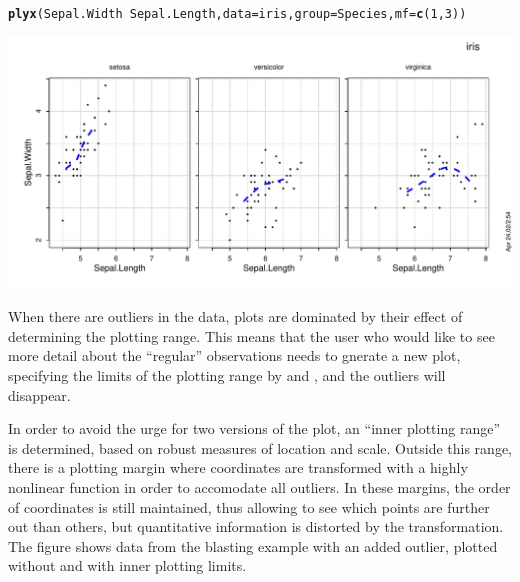 \documentclass[11pt]{article}\usepackage[]{graphicx}\usepackage[]{color}
\makeatletter
\def\maxwidth{ %
  \ifdim\Gin@nat@width>\linewidth
    \linewidth
  \else
    \Gin@nat@width
  \fi
}
\newcommand{\hlnum}[1]{\textcolor[rgb]{0.686,0.059,0.569}{#1}}%
\newcommand{\hlopt}[1]{\textcolor[rgb]{0,0,0}{#1}}%
\newcommand{\hlstd}[1]{\textcolor[rgb]{0.345,0.345,0.345}{#1}}%
\newcommand{\hlkwc}[1]{\textcolor[rgb]{0.333,0.667,0.333}{#1}}%
\newcommand{\hlkwd}[1]{\textcolor[rgb]{0.737,0.353,0.396}{\textbf{#1}}}%
\newenvironment{kframe}{%
 \def\at@end@of@kframe{}%
 \ifinner\ifhmode%
  \def\at@end@of@kframe{\end{minipage}}%
  \begin{minipage}{\columnwidth}%
 \fi\fi%
 \def\FrameCommand##1{\hskip\@totalleftmargin \hskip-\fboxsep
 \colorbox{shadecolor}{##1}\hskip-\fboxsep
     \hskip-\linewidth \hskip-\@totalleftmargin \hskip\columnwidth}%
 \MakeFramed {\advance\hsize-\width
   \@totalleftmargin\z@ \linewidth\hsize
   \@setminipage}}%
 {\par\unskip\endMakeFramed%
 \at@end@of@kframe}
\newenvironment{knitrout}{}{} %
\makeatother
\begin{document}
\begin{knitrout}
\color{fgcolor}\begin{kframe}
\begin{alltt}
\hlkwd{plyx}\hlstd{(Sepal.Width}\hlopt{~}\hlstd{Sepal.Length,} \hlkwc{data}\hlstd{=iris,} \hlkwc{group}\hlstd{=Species,} \hlkwc{mf}\hlstd{=}\hlkwd{c}\hlstd{(}\hlnum{1}\hlstd{,}\hlnum{3}\hlstd{))}
\end{alltt}
\end{kframe}
\includegraphics[width=\maxwidth]{figure/plyx_group-1} 

\end{knitrout}

When there are outliers in the data, plots are dominated by their effect of
determining the plotting range. This means that the user who would like to
see more detail about the ``regular'' observations needs to gnerate a new
plot, specifying the limits of the plotting range by  and ,
and the outliers will disappear.

In order to avoid the urge for two versions of the plot, an ``inner
plotting range'' is determined, based on robust measures of 
location and scale. Outside this range, there is a plotting margin where
coordinates are transformed with a highly nonlinear function in order to
accomodate all outliers. 
In these margins, the order of coordinates is still maintained, thus
allowing to see which points are further out than others, but quantitative
information is distorted by the transformation.
The figure shows data from the blasting example with an added outlier,
plotted without and with inner plotting limits.
\end{document}
